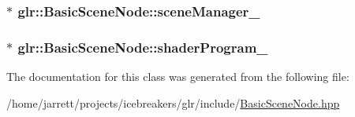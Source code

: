 \hypertarget{classglr_1_1BasicSceneNode_ac7e2e35880f8aac581fc01a8d96be89d}{
\subsubsection[{scene\-Manager\-\_\-}]{$\ast$ glr\-::\-Basic\-Scene\-Node\-::scene\-Manager\-\_\-\hspace{0.3cm}{\ttfamily [protected]}}}\label{classglr_1_1BasicSceneNode_ac7e2e35880f8aac581fc01a8d96be89d}
\hypertarget{classglr_1_1BasicSceneNode_a5c51888436caf0096125b3f94d177bae}{
\subsubsection[{shader\-Program\-\_\-}]{$\ast$ glr\-::\-Basic\-Scene\-Node\-::shader\-Program\-\_\-\hspace{0.3cm}{\ttfamily [protected]}}}\label{classglr_1_1BasicSceneNode_a5c51888436caf0096125b3f94d177bae}


The documentation for this class was generated from the following file\-:\begin{DoxyCompactItemize}
\item 
/home/jarrett/projects/icebreakers/glr/include/\hyperlink{BasicSceneNode_8hpp}{Basic\-Scene\-Node.\-hpp}\end{DoxyCompactItemize}
